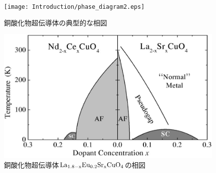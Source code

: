 \begin{figure}[!h]
 \begin{minipage}{0.4\hsize}
    \begin{center}
   \texttt{[image: Introduction/phase\_diagram2.eps]}
  \end{center}
  \caption{銅酸化物超伝導体の典型的な相図\cite{Cavalleri2018}}
  \label{fig:phase_diagram2}
 \end{minipage}
 \begin{minipage}{0.6\hsize}
    \begin{center}
   \includegraphics[width=\hsize]{Introduction/phase_diagram.eps}
  \end{center}
  \caption{銅酸化物超伝導体$\rm La_{1.8-x}Eu_{0.2}Sr_{x}CuO_4$の相図\cite{Andrea2003}}
  \label{fig:phase_diagram}
 \end{minipage}
\end{figure}

